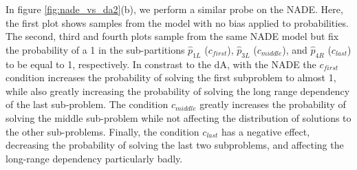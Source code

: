 \documentclass[twoside]{article}
\begin{document}
In figure \ref{fig:nade_vs_da2}(b), we perform a similar probe on the NADE. Here, the first plot shows samples from the model with no bias applied to probabilities. The second, third and fourth plots sample from the same NADE model but fix the probability of a 1 in the sub-partitions \(\hat{p}_{1L}\) (\(c_{first}\)), \(\hat{p}_{3L}\) (\(c_{middle}\)), and \(\hat{p}_{4R}\) (\(c_{last}\)) to be equal to 1, respectively. In constrast to the dA, with the NADE the \(c_{first}\) condition increases the probability of solving the first subproblem to almost 1, while also greatly increasing the probability of solving the long range dependency of the last sub-problem. The condition \(c_{middle}\) greatly increases the probability of solving the middle sub-problem while not affecting the distribution of solutions to the other sub-problems. Finally, the condition \(c_{last}\) has a negative effect, decreasing the probability of solving the last two subproblems, and affecting the long-range dependency particularly badly.
\end{document}
